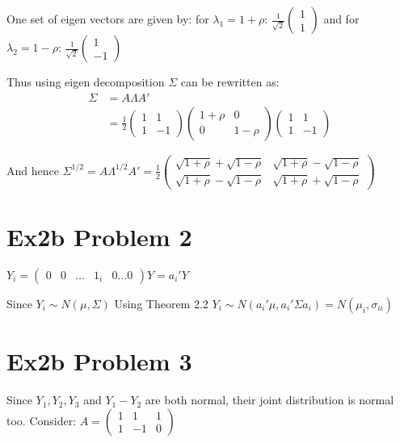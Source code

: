 \documentclass[a4paper]{article}
\begin{document}
One set of eigen vectors are given by: for $\lambda_1=1+\rho$: $\frac{1}{\sqrt{2}}\begin{pmatrix}1\\1 \end{pmatrix}$
and for $\lambda_2=1-\rho$: $\frac{1}{\sqrt{2}}\begin{pmatrix} 1 \\ -1 \end{pmatrix}$

Thus using eigen decomposition $\Sigma$ can be rewritten as:
\begin{align*}
\Sigma &= A\Lambda A'\\
&=\frac{1}{2}\begin{pmatrix}
1 & 1\\
1 & -1 
\end{pmatrix}\begin{pmatrix}
1+\rho & 0\\
0 & 1-\rho
\end{pmatrix}\begin{pmatrix}
1 & 1\\
1 & -1 
\end{pmatrix}
\end{align*}

And hence $\Sigma^{1/2} = A\Lambda^{1/2} A' = \frac{1}{2}\begin{pmatrix}
\sqrt{1+\rho} + \sqrt{1-\rho} & \sqrt{1+\rho} - \sqrt{1-\rho}\\
\sqrt{1+\rho} - \sqrt{1-\rho} & \sqrt{1+\rho} + \sqrt{1-\rho}
\end{pmatrix}$

\section*{Ex2b Problem 2}

$Y_i = \begin{pmatrix} 0 & 0 & \dots & 1_i & 0 \dots 0 \end{pmatrix}Y =a_i'Y$

Since $Y_i \sim N(\mu, \Sigma)$ Using Theorem 2.2
$Y_i \sim N(a_i'\mu, a_i'\Sigma a_i) = N(\mu_i, \sigma_{ii})$


\section*{Ex2b Problem 3}
Since $Y_1,Y_2,Y_3$ and $Y_1-Y_2$ are both normal, their joint distribution is normal too.
Consider: $A = \begin{pmatrix}
1 & 1 & 1\\
1 & -1 & 0
\end{pmatrix}$
\end{document}
